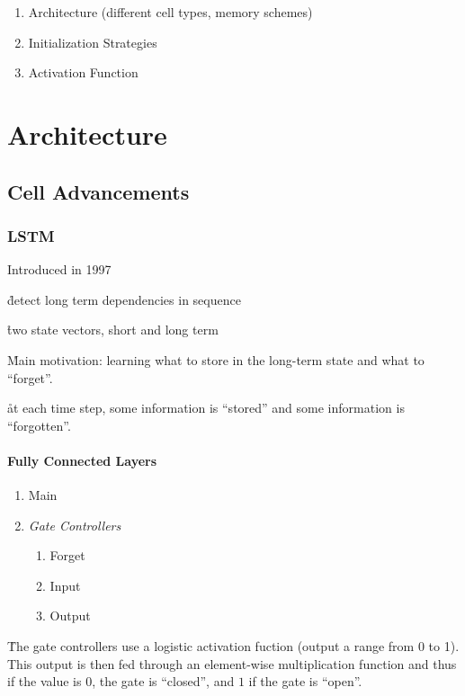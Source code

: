 \begin{enumerate}[noitemsep,topsep=0pt]
	\item Architecture (different cell types, memory schemes)
	\item Initialization Strategies
	\item Activation Function
\end{enumerate}




\section{Architecture}


\subsection{Cell Advancements}

\subsubsection{LSTM}

Introduced in 1997 %

\r{detect long term dependencies in sequence}

\r{two state vectors, short and long term}

\r{Main motivation: learning what to store in the long-term state and what to ``forget''.}

\r{at each time step, some information is ``stored'' and some information is ``forgotten''.}

\paragraph{Fully Connected Layers}


\begin{enumerate}[noitemsep,topsep=0pt]
	\item Main
	\item \textit{Gate Controllers}
	\begin{enumerate}[noitemsep,topsep=0pt]
		\item Forget
		\item Input
		\item Output
	\end{enumerate}
\end{enumerate}

\r{The gate controllers use a logistic activation fuction (output a range from 0 to 1). This output is then fed through an element-wise multiplication function and thus if the value is $0$, the gate is ``closed'', and $1$ if the gate is ``open''.}

